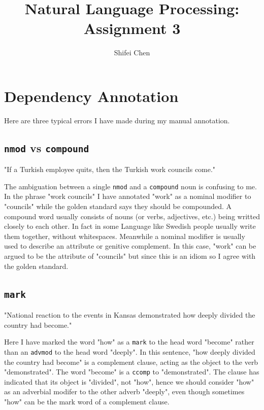 \documentclass[11pt]{article} %
\title{{\LARGE Natural Language Processing: Assignment 3}\\[1.5mm]} %
\author{Shifei Chen} %
\begin{document}
\maketitle

\section{Dependency Annotation}

Here are three typical errors I have made during my manual annotation.

\subsection{\texttt{nmod} vs \texttt{compound}}

\begin{displayquote}
  "If a Turkish employee quits, then the Turkish work councils come."
\end{displayquote}

The ambiguation between a single \texttt{nmod} and a \texttt{compound} noun is confusing to me. In the phrase "work councils" I have annotated "work" as a nominal modifier to "councils" while the golden standard says they should be compounded. A compound word usually consists of nouns (or verbs, adjectives, etc.) being writted closely to each other. In fact in some Language like Swedish people usually write them together, without whitespaces. Meanwhile a nominal modifier is usually used to describe an attribute or genitive complement\cite{NmodUD}. In this case, "work" can be argued to be the attribute of "councils" but since this is an idiom\cite{WorksCouncilWiki} so I agree with the golden standard.

\subsection{\texttt{mark}}

\begin{displayquote}
  "National reaction to the events in Kansas demonstrated how deeply divided the country had become."
\end{displayquote}

Here I have marked the word "how" as a \texttt{mark} to the head word "become" rather than an \texttt{advmod} to the head word "deeply". In this sentence, "how deeply divided the country had become" is a complement clause, acting as the object to the verb "demonstrated". The word "become" is a \texttt{ccomp} to "demonstrated"\cite{CcompUD}. The clause has indicated that its object is "divided", not "how", hence we should consider "how" as an adverbial modifer to the other adverb "deeply", even though sometimes "how" can be the mark word of a complement clause\cite{MarkUD}.
\end{document}
